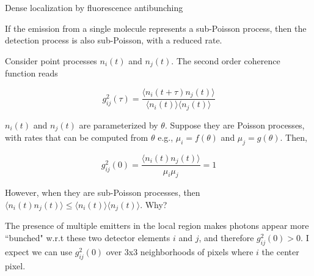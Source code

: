 \documentclass{beamer}					%
\begin{document}

\begin{frame}{Dense localization by fluorescence antibunching}

If the emission from a single molecule represents a sub-Poisson process, then the detection process is also sub-Poisson, with a reduced rate. 

Consider point processes $n_{i}(t)$ and $n_{j}(t)$. The second order coherence function reads

\begin{equation*}
g^{2}_{ij}(\tau) = \frac{\langle n_{i}(t+\tau)n_{j}(t)\rangle}{\langle n_{i}(t)\rangle\langle n_{j}(t)\rangle}
\end{equation*}

$n_{i}(t)$ and $n_{j}(t)$ are parameterized by $\theta$. Suppose they are Poisson processes, with rates that can be computed from $\theta$ e.g., $\mu_{i} = f(\theta)$ and $\mu_{j} = g(\theta)$. Then, 

\begin{equation*}
g^{2}_{ij}(0) = \frac{\langle n_{i}(t)n_{j}(t)\rangle}{\mu_{i}\mu_{j}} = 1
\end{equation*}

However, when they are sub-Poisson processes, then $\langle n_{i}(t)n_{j}(t)\rangle \leq \langle n_{i}(t)\rangle\langle n_{j}(t)\rangle$. Why?

The presence of multiple emitters in the local region makes photons appear more ``bunched" w.r.t these two detector elements $i$ and $j$, and therefore $g^{2}_{ij}(0) > 0$. I expect we can use $g^{2}_{ij}(0)$ over 3x3 neighborhoods of pixels where $i$ the center pixel.

\end{frame}
\end{document}
